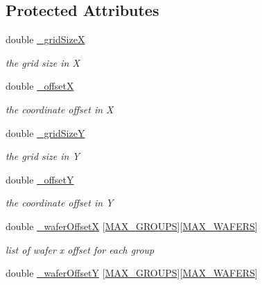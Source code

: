 \subsection*{Protected Attributes}
\begin{DoxyCompactItemize}
\item 
double \hyperlink{class_d_d4hep_1_1_d_d_segmentation_1_1_wafer_grid_x_y_af1d00f186fda3aca2aed961911bc3c04}{\+\_\+grid\+SizeX}
\begin{DoxyCompactList}\small\item\em the grid size in X \end{DoxyCompactList}\item 
double \hyperlink{class_d_d4hep_1_1_d_d_segmentation_1_1_wafer_grid_x_y_a4cfbedf40751f8d064a0e4c071a04d66}{\+\_\+offsetX}
\begin{DoxyCompactList}\small\item\em the coordinate offset in X \end{DoxyCompactList}\item 
double \hyperlink{class_d_d4hep_1_1_d_d_segmentation_1_1_wafer_grid_x_y_ae68069d981e55954dc25e9fbc8cc2e11}{\+\_\+grid\+SizeY}
\begin{DoxyCompactList}\small\item\em the grid size in Y \end{DoxyCompactList}\item 
double \hyperlink{class_d_d4hep_1_1_d_d_segmentation_1_1_wafer_grid_x_y_a560e795ea397f1a782c15d1e782f70ae}{\+\_\+offsetY}
\begin{DoxyCompactList}\small\item\em the coordinate offset in Y \end{DoxyCompactList}\item 
double \hyperlink{class_d_d4hep_1_1_d_d_segmentation_1_1_wafer_grid_x_y_ad9ff5f530eeddcdbe40f2362a96bcd84}{\+\_\+wafer\+OffsetX} \mbox{[}\hyperlink{_d_d_segmentation_2include_2_d_d_segmentation_2_wafer_grid_x_y_8h_a36d20ba74425036fd66f863bb89adeda}{M\+A\+X\+\_\+\+G\+R\+O\+U\+PS}\mbox{]}\mbox{[}\hyperlink{_d_d_segmentation_2include_2_d_d_segmentation_2_wafer_grid_x_y_8h_ace2f1e396fdb2a1510290218c8cb476a}{M\+A\+X\+\_\+\+W\+A\+F\+E\+RS}\mbox{]}
\begin{DoxyCompactList}\small\item\em list of wafer x offset for each group \end{DoxyCompactList}\item 
double \hyperlink{class_d_d4hep_1_1_d_d_segmentation_1_1_wafer_grid_x_y_a247bd183dfa82726c4d455d4e814622f}{\+\_\+wafer\+OffsetY} \mbox{[}\hyperlink{_d_d_segmentation_2include_2_d_d_segmentation_2_wafer_grid_x_y_8h_a36d20ba74425036fd66f863bb89adeda}{M\+A\+X\+\_\+\+G\+R\+O\+U\+PS}\mbox{]}\mbox{[}\hyperlink{_d_d_segmentation_2include_2_d_d_segmentation_2_wafer_grid_x_y_8h_ace2f1e396fdb2a1510290218c8cb476a}{M\+A\+X\+\_\+\+W\+A\+F\+E\+RS}\mbox{]}

\end{DoxyCompactItemize}
